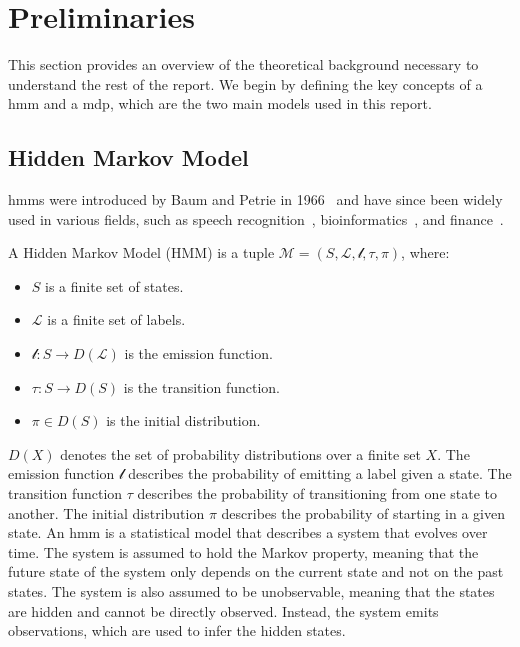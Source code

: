 \section{Preliminaries}\label{sec:preliminaries}
This section provides an overview of the theoretical background necessary to understand the rest of the report.
We begin by defining the key concepts of a \gls{hmm} and a \gls{mdp}, which are the two main models used in this report.


\subsection{Hidden Markov Model}\label{subsec:hmm}
\glspl{hmm} were introduced by Baum and Petrie in 1966~\cite{baum1966statistical} and have since been widely used in various fields, such as speech recognition~\cite{chavan2013overview}, bioinformatics~\cite{ciocchetta2009bio}, and finance~\cite{mamon2007hidden}.
\begin{definition}
    A Hidden Markov Model (HMM) is a tuple $\mathcal{M} = (S, \mathcal{L}, \mathscr{l}, \tau,  \pi)$, where:
    \begin{itemize}
        \item $S$ is a finite set of states.
        \item $\mathcal{L}$ is a finite set of labels.
        \item $\mathscr{l}: S \rightarrow D(\mathcal{L})$ is the emission function.
        \item $\tau: S \rightarrow D(S)$ is the transition function.
        \item $\pi \in D(S)$ is the initial distribution.
    \end{itemize}
\end{definition}

$D(X)$ denotes the set of probability distributions over a  finite set $X$.
The emission function $\mathscr{l}$ describes the probability of emitting a label given a state.
The transition function $\tau$ describes the probability of transitioning from one state to another.
The initial distribution $\pi$ describes the probability of starting in a given state.
An \gls{hmm} is a statistical model that describes a system that evolves over time.
The system is assumed to hold the Markov property, meaning that the future state of the system only depends on the current state and not on the past states.
The system is also assumed to be unobservable, meaning that the states are hidden and cannot be directly observed.
Instead, the system emits observations, which are used to infer the hidden states.

